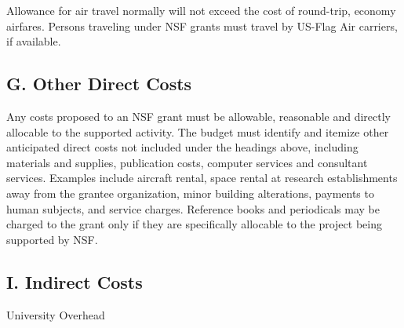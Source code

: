 Allowance for air travel normally will not exceed the cost of
round-trip, economy airfares. Persons traveling under NSF grants must
travel by US-Flag Air carriers, if available.



\subsection*{G. Other Direct Costs}
Any costs proposed to an NSF grant must be allowable, reasonable and
directly allocable to the supported activity. The budget must identify
and itemize other anticipated direct costs not included under the
headings above, including materials and supplies, publication costs,
computer services and consultant services. Examples include aircraft
rental, space rental at research establishments away from the grantee
organization, minor building alterations, payments to human subjects,
and service charges. Reference books and periodicals may be charged to
the grant only if they are specifically allocable to the project being
supported by NSF.

\subsection*{I. Indirect Costs}
University Overhead
